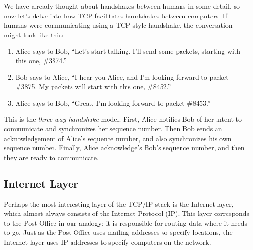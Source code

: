 We have already thought about handshakes between humans in some detail, so now let's delve into how TCP facilitates handshakes between computers. If humans were communicating using a TCP-style handshake, the conversation might look like this:
\begin{enumerate}
    \item Alice says to Bob, ``Let's start talking. I'll send some packets, starting with this one, \#3874.''
    \item Bob says to Alice, ``I hear you Alice, and I'm looking forward to packet \#3875. My packets will start with this one, \#8452.''
    \item Alice says to Bob, ``Great, I'm looking forward to packet \#8453.''
\end{enumerate}
This is the \emph{three-way handshake} model. First, Alice notifies Bob of her intent to communicate and synchronizes her sequence number. Then Bob sends an acknowledgement of Alice's sequence number, and also synchronizes his own sequence number. Finally, Alice acknowledge's Bob's sequence number, and then they are ready to communicate.


\subsection{Internet Layer}

Perhaps the most interesting layer of the TCP/IP stack is the Internet layer, which almost always consists of the Internet Protocol (IP). This layer corresponds to the Post Office in our analogy: it is responsible for routing data where it needs to go. Just as the Post Office uses mailing addresses to specify locations, the Internet layer uses IP addresses to specify computers on the network.

